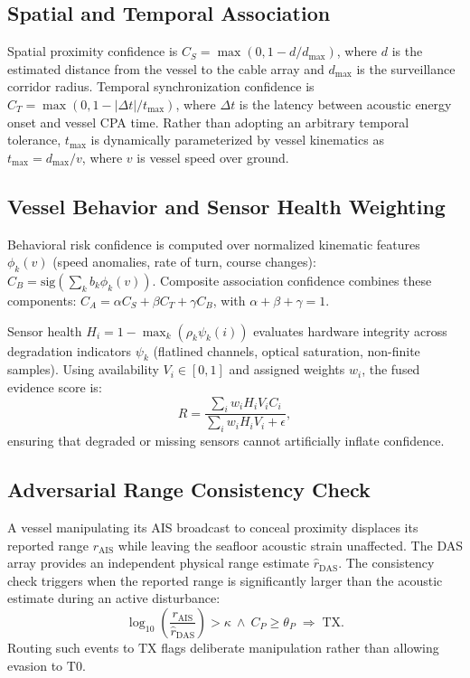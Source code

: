\documentclass[conference]{IEEEtran}
\newcommand{\dstate}[1]{\ensuremath{\mathrm{#1}}}
\begin{document}
\subsection{Spatial and Temporal Association}
Spatial proximity confidence is $C_S = \max(0, 1 - d/d_{\max})$, where $d$ is
the estimated distance from the vessel to the cable array and $d_{\max}$ is the
surveillance corridor radius. Temporal synchronization confidence is
$C_T = \max(0, 1 - |\Delta t| / t_{\max})$, where $\Delta t$ is the latency
between acoustic energy onset and vessel CPA time. Rather than adopting an
arbitrary temporal tolerance, $t_{\max}$ is dynamically parameterized by vessel
kinematics as $t_{\max} = d_{\max} / v$, where $v$ is vessel speed over ground.

\subsection{Vessel Behavior and Sensor Health Weighting}
Behavioral risk confidence is computed over normalized kinematic features
$\phi_k(v)$ (speed anomalies, rate of turn, course changes):
$C_B = \mathrm{sig}\!\left(\sum_k b_k \phi_k(v)\right)$. Composite association
confidence combines these components: $C_A = \alpha C_S + \beta C_T + \gamma C_B$,
with $\alpha + \beta + \gamma = 1$.

Sensor health $H_i = 1 - \max_k(\rho_k \psi_k(i))$ evaluates hardware integrity
across degradation indicators $\psi_k$ (flatlined channels, optical saturation,
non-finite samples). Using availability $V_i \in [0, 1]$ and assigned weights
$w_i$, the fused evidence score is:
\begin{equation}
R = \frac{\sum_i w_i H_i V_i C_i}{\sum_i w_i H_i V_i + \epsilon},
\end{equation}
ensuring that degraded or missing sensors cannot artificially inflate confidence.

\subsection{Adversarial Range Consistency Check}
A vessel manipulating its AIS broadcast to conceal proximity displaces its
reported range $r_{\mathrm{AIS}}$ while leaving the seafloor acoustic strain
unaffected. The DAS array provides an independent physical range estimate
$\hat{r}_{\mathrm{DAS}}$. The consistency check triggers when the reported range
is significantly larger than the acoustic estimate during an active disturbance:
\begin{equation}
\log_{10}\!\left(\frac{r_{\mathrm{AIS}}}{\hat{r}_{\mathrm{DAS}}}\right) > \kappa
\ \wedge\ C_P \geq \theta_P \;\Rightarrow\; \dstate{TX}.
\label{eq:consistency}
\end{equation}
Routing such events to \dstate{TX} flags deliberate manipulation rather than
allowing evasion to \dstate{T0}.
\end{document}
